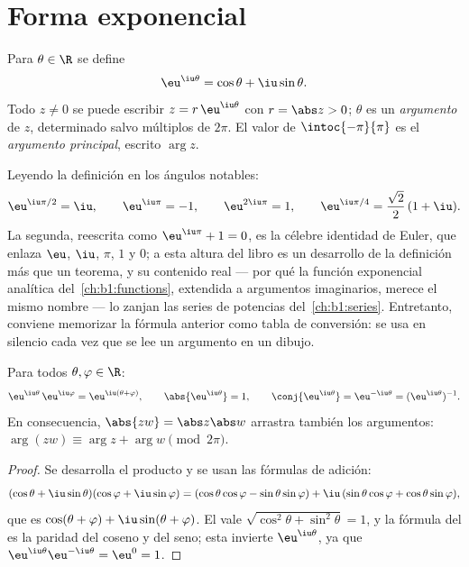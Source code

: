 \section{Forma exponencial}

\begin{definition}\label{def:b1:complex:expi}
Para $\theta \in \R$ se define
\[
\eu^{\iu\theta} = \cos\theta + \iu \sin\theta .
\]
Todo $z \neq 0$ se puede escribir $z = r\,\eu^{\iu\theta}$ con
$r = \abs z > 0$; $\theta$ es un \emph{argumento} de
$z$, determinado salvo múltiplos de $2\pi$. El valor de
$\intoc{-\pi}{\pi}$ es el \emph{argumento principal}, escrito
$\arg z$.
\end{definition}

\begin{example}\label{ex:b1:complex:eulerid}
Leyendo la definición en los ángulos notables:
\[
\eu^{\iu\pi/2} = \iu, \qquad
\eu^{\iu\pi} = -1, \qquad
\eu^{2\iu\pi} = 1, \qquad
\eu^{\iu\pi/4} = \frac{\sqrt2}2\,(1 + \iu) .
\]
La segunda, reescrita como $\eu^{\iu\pi} + 1 = 0$, es la célebre
identidad de Euler, que enlaza $\eu$, $\iu$, $\pi$, $1$ y $0$; a esta
altura del libro es un desarrollo de la definición más que un teorema,
y su contenido real --- por qué la función exponencial analítica
del~\cref{ch:b1:functions}, extendida a argumentos imaginarios, merece
el mismo nombre --- lo zanjan las series de potencias
del~\cref{ch:b1:series}. Entretanto, conviene memorizar la fórmula
anterior como tabla de conversión: se usa en silencio cada vez que se
lee un argumento en un dibujo.
\end{example}

\begin{theorem}\label{thm:b1:complex:funceq}
Para todos $\theta, \varphi \in \R$:
\[
\eu^{\iu\theta}\, \eu^{\iu\varphi} = \eu^{\iu(\theta + \varphi)},
\qquad
\abs{\eu^{\iu\theta}} = 1,
\qquad
\conj{\eu^{\iu\theta}} = \eu^{-\iu\theta} = (\eu^{\iu\theta})^{-1}.
\]
En consecuencia, $\abs{zw} = \abs z \abs w$ arrastra también los
argumentos: $\arg(zw) \equiv \arg z + \arg w \pmod{2\pi}$.
\end{theorem}

\begin{proof}
Se desarrolla el producto y se usan las fórmulas de adición:
\[
(\cos\theta + \iu\sin\theta)(\cos\varphi + \iu\sin\varphi)
= (\cos\theta\cos\varphi - \sin\theta\sin\varphi)
+ \iu\,(\sin\theta\cos\varphi + \cos\theta\sin\varphi),
\]
que es $\cos(\theta+\varphi) + \iu\sin(\theta+\varphi)$. El  vale
$\sqrt{\cos^2\theta + \sin^2\theta} = 1$, y la fórmula del  es
la paridad del coseno y del seno; esta invierte $\eu^{\iu\theta}$, ya
que $\eu^{\iu\theta}\eu^{-\iu\theta} = \eu^0 = 1$.
\end{proof}

